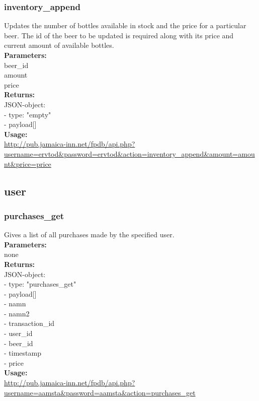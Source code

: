 \documentclass{article}
\begin{document}
\subsubsection{inventory\_append}
Updates the number of bottles available in stock and the price for a particular beer. The id of the beer to be updated is required along with its price and current amount of available bottles.\\
\textbf{Parameters:}\\
beer\_id\\
amount\\
price\\
\textbf{Returns:}\\
JSON-object:\\
- type: "empty"\\
- payload[]\\
\textbf{Usage:}\\
\url{http://pub.jamaica-inn.net/fpdb/api.php?username=ervtod\&password=ervtod\&action=inventory\_append\&amount=amount\&price=price}\\

\subsection{user}
\subsubsection{purchases\_get}
Gives a list of all purchases made by the specified user.\\
\textbf{Parameters:}\\
none\\
\textbf{Returns:}\\
JSON-object:\\
- type: "purchases\_get"\\
- payload[]\\
\indent  - namn\\
\indent  - namn2\\
\indent  - transaction\_id\\
\indent  - user\_id\\
\indent  - beer\_id\\
\indent  - timestamp\\
\indent  - price\\
\textbf{Usage:}\\
\url{http://pub.jamaica-inn.net/fpdb/api.php?username=aamsta\&password=aamsta\&action=purchases\_get}\\
    
\end{document}
